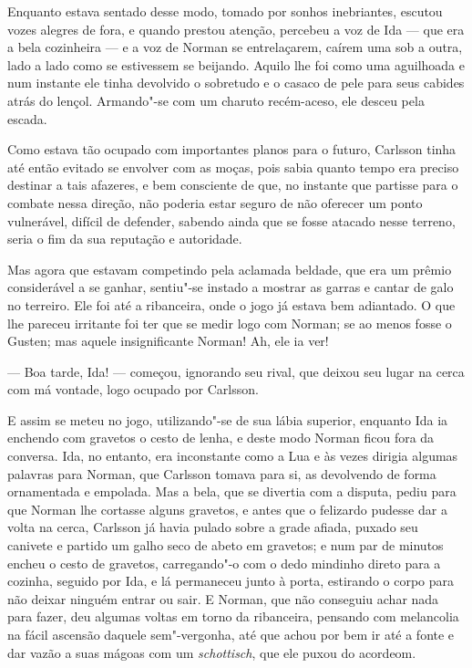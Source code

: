 Enquanto estava sentado desse modo, tomado por sonhos inebriantes, escutou
vozes alegres de fora, e quando prestou atenção, percebeu a voz de Ida --- que
era a bela cozinheira --- e a voz de Norman se entrelaçarem, caírem uma sob a
outra, lado a lado como se estivessem se beijando. Aquilo lhe foi como uma
aguilhoada e num instante ele tinha devolvido o sobretudo e o casaco de 
pele para seus cabides atrás do lençol. Armando"-se com um charuto 
recém-aceso, ele desceu pela escada.

Como estava tão ocupado com importantes planos para o futuro, Carlsson tinha até
então evitado se envolver com as moças, pois sabia quanto tempo era preciso 
destinar a tais afazeres, e bem consciente de que, no instante que
partisse para o combate nessa direção, não poderia estar seguro de não oferecer
um ponto vulnerável, difícil de defender, sabendo ainda que se fosse atacado nesse
terreno, seria o fim da sua reputação e autoridade.

Mas agora que estavam competindo pela aclamada beldade, que era um prêmio
considerável a se ganhar, sentiu"-se instado a mostrar as garras e cantar de
galo no terreiro. Ele foi até a ribanceira, onde o jogo já estava bem adiantado. O
que lhe pareceu irritante foi ter que se medir logo com Norman; se ao menos
fosse o Gusten; mas aquele insignificante Norman! Ah, ele ia ver!

--- Boa tarde, Ida! --- começou, ignorando seu rival, que deixou seu lugar na
cerca com má vontade, logo ocupado por Carlsson.

E assim se meteu no jogo, utilizando"-se de sua lábia superior, enquanto Ida ia
enchendo com gravetos o cesto de lenha, e deste modo Norman ficou fora da
conversa. Ida, no entanto, era inconstante como a Lua e às vezes dirigia
algumas palavras para Norman, que Carlsson tomava para si, as devolvendo de
forma ornamentada e empolada. Mas a bela, que se divertia com a disputa, pediu
para que Norman lhe cortasse alguns gravetos, e antes que o felizardo pudesse
dar a volta na cerca, Carlsson já havia pulado sobre a grade afiada, puxado seu
canivete e partido um galho seco de abeto em gravetos; e num par de minutos
encheu o cesto de gravetos, carregando"-o com o dedo mindinho direto para a
cozinha, seguido por Ida, e lá permaneceu junto à porta, estirando o corpo para
não deixar ninguém entrar ou sair. E Norman, que não conseguiu achar nada para
fazer, deu algumas voltas em torno da ribanceira, pensando com melancolia na
fácil ascensão daquele sem"-vergonha, até que achou por bem ir até a fonte e dar
vazão a suas mágoas com um \textit{schottisch}, que ele puxou do acordeom.


